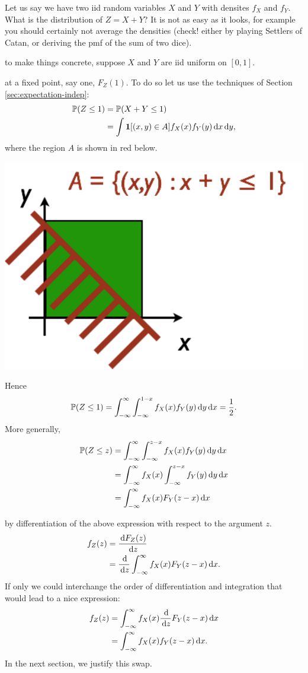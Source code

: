 \documentclass{article}
\begin{document}
Let us say we have two iid random variables $X$ and $Y$ with densites $f_X$ and $f_Y$. What is the distribution of $Z = X + Y$? It is not as easy as it looks, for example you should certainly not average the densities (check! either by playing Settlers of Catan, or deriving the pmf of the sum of two dice).

 to make things concrete, suppose $X$ and $Y$ are iid uniform on $[0, 1]$.

 at a fixed point, say one, $F_Z(1)$. To do so let us use the techniques of Section \ref{sec:expectation-indep}:
\begin{align*}
{\mathbb P}(Z \le 1) &= {\mathbb P}(X + Y \le 1) \\
 &= \int {\mathbf 1}[(x,y) \in A] f_X(x) f_Y(y) \,\mathrm{d} x \,\mathrm{d} y,
\end{align*}
where the region $A$ is shown in red below.
\begin{center}
	\includegraphics[width=0.3\linewidth]{figures/region} 
\end{center}
Hence 
\[ {\mathbb P}(Z \le 1) = \int_{-\infty}^\infty \int_{-\infty}^{1-x} f_X(x) f_Y(y) \,\mathrm{d} y \,\mathrm{d} x = \frac{1}{2}. \]
More generally,
\begin{align*}
{\mathbb P}(Z \le z) &= \int_{-\infty}^\infty \int_{-\infty}^{z-x} f_X(x) f_Y(y) \,\mathrm{d} y \,\mathrm{d} x \\
&= \int_{-\infty}^\infty f_X(x) \int_{-\infty}^{z-x}  f_Y(y) \,\mathrm{d} y \,\mathrm{d} x \\
&= \int_{-\infty}^\infty f_X(x) F_Y(z - x) \,\mathrm{d} x
\end{align*}

 by differentiation of the above expression with respect to the argument $z$. 
\begin{align*}
f_Z(z) &= \frac{\,\mathrm{d} F_Z(z)}{\,\mathrm{d} z} \\
&= \frac{\,\mathrm{d}}{\,\mathrm{d} z} \int_{-\infty}^\infty f_X(x) F_Y(z - x) \,\mathrm{d} x.
\end{align*}
If only we could interchange the order of differentiation and integration that would lead to a nice expression:
\begin{align*}
f_Z(z) &=
 \int_{-\infty}^\infty f_X(x) \frac{\,\mathrm{d}}{\,\mathrm{d} z} F_Y(z - x) \,\mathrm{d} x \\
  &=
  \int_{-\infty}^\infty f_X(x) f_Y(z - x) \,\mathrm{d} x.
\end{align*}
In the next section, we justify this swap.
\end{document}
